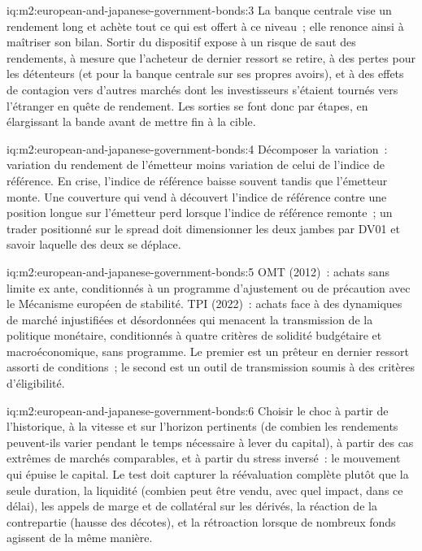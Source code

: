 \begin{solution}{iq:m2:european-and-japanese-government-bonds:3}
La banque centrale vise un rendement long et achète tout ce qui est offert à ce niveau~; elle
renonce ainsi à maîtriser son bilan. Sortir du dispositif expose à un risque de saut des
rendements, à mesure que l'acheteur de dernier ressort se retire, à des pertes pour les détenteurs
(et pour la banque centrale sur ses propres avoirs), et à des effets de contagion vers d'autres marchés
dont les investisseurs s'étaient tournés vers l'étranger en quête de rendement. Les sorties se font donc
par étapes, en élargissant la bande avant de mettre fin à la cible.
\end{solution}

\begin{solution}{iq:m2:european-and-japanese-government-bonds:4}
Décomposer la variation~: variation du rendement de l'émetteur moins variation de celui de l'indice de référence. En crise, l'indice de référence
baisse souvent tandis que l'émetteur monte. Une couverture qui vend à découvert l'indice de référence
contre une position longue sur l'émetteur perd lorsque l'indice de référence remonte~; un
trader positionné sur le spread doit dimensionner les deux jambes par DV01 et savoir laquelle
des deux se déplace.
\end{solution}

\begin{solution}{iq:m2:european-and-japanese-government-bonds:5}
OMT (2012)~: achats sans limite ex ante, conditionnés à un programme d'ajustement ou de précaution
avec le Mécanisme européen de stabilité. TPI (2022)~: achats face à des dynamiques de marché
injustifiées et désordonnées qui menacent la transmission de la politique monétaire, conditionnés à
quatre critères de solidité budgétaire et macroéconomique, sans programme. Le premier est un prêteur
en dernier ressort assorti de conditions~; le second est un outil de transmission
soumis à des critères d'éligibilité.
\end{solution}

\begin{solution}{iq:m2:european-and-japanese-government-bonds:6}
Choisir le choc à partir de l'historique, à la vitesse et sur l'horizon pertinents (de combien les rendements
peuvent-ils varier pendant le temps nécessaire à lever du capital), à partir des cas extrêmes de marchés
comparables, et à partir du stress inversé~: le mouvement qui épuise le capital.
Le test doit capturer la réévaluation complète plutôt que la seule duration, la liquidité (combien peut être vendu,
avec quel impact, dans ce délai), les appels de marge et de collatéral
sur les dérivés, la réaction de la contrepartie (hausse des décotes), et la
rétroaction lorsque de nombreux fonds agissent de la même manière.
\end{solution}
